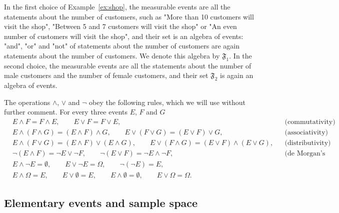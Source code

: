 \begin{example}
	\label{ex:shop_algebra}
	In the first choice of Example~\ref{ex:shop}, the measurable events are all the statements about the number of customers, such as "More than 10 customers will visit the shop", "Between 5 and 7 customers will visit the shop" or "An even number of customers will visit the shop", and their set is an algebra of events: "and", "or" and "not" of statements about the number of customers are again statements about the number of customers. We denote this algebra by $\mathfrak F_1$. In the second choice, the measurable events are all the statements about the number of male customers and the number of female customers, and their set $\mathfrak F_2$ is again an algebra of events. 
\end{example}



The operations $\wedge$, $\vee$ and $\neg$ obey the following rules, which we will use without further comment. For every three events $E$, $F$ and $G$ 
\begin{align}
	\label{e:rules}
	& E \wedge F = F \wedge E, \qquad E \vee F = F \vee E, && \text{(commutativity)} \nonumber \\ 
	& E \wedge (F \wedge G) = (E \wedge F) \wedge G, \qquad E \vee (F \vee G) = (E \vee F) \vee G, && \text{(associativity)} \nonumber \\
	& E \wedge (F \vee G) = (E \wedge F) \vee (E \wedge G), \qquad E \vee (F \wedge G) = (E \vee F) \wedge (E \vee G), && \text{(distributivity)} \nonumber \\
	& \neg (E \wedge F) = \neg E \vee \neg F, \qquad \neg (E \vee F) = \neg E \wedge \neg F, && \text{(de Morgan's laws)} \nonumber \\
	& E \wedge \neg E = \emptyset, \qquad E \vee \neg E = \Omega, \qquad \neg (\neg E) = E, \nonumber \\
	& E \wedge \Omega = E, \qquad E \vee \emptyset = E, \qquad E \wedge \emptyset = \emptyset, \qquad E \vee \Omega = \Omega. 
\end{align}


\subsection{Elementary events and sample space}
\label{ss:elementary}

